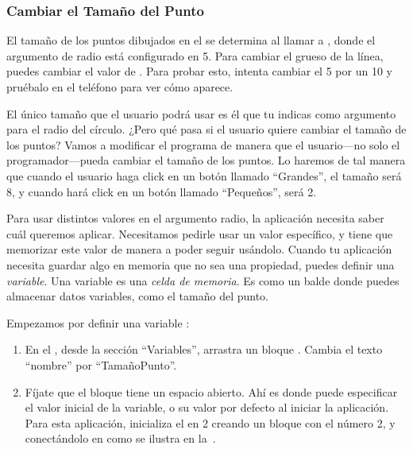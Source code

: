 \subsubsection*{Cambiar el Tamaño del Punto}

El tamaño de los puntos dibujados en el  se
determina al llamar a , donde el
argumento de radio está configurado en 5. Para cambiar el grueso de la
línea, puedes cambiar el valor de . Para probar esto,
intenta cambiar el 5 por un 10 y pruébalo en el teléfono para ver cómo
aparece.

El único tamaño que el usuario podrá usar es él que tu indicas como
argumento para el radio del círculo. ¿Pero qué pasa si el usuario
quiere cambiar el tamaño de los puntos? Vamos a modificar el programa
de manera que el usuario---no solo el programador---pueda cambiar el
tamaño de los puntos. Lo haremos de tal manera que cuando el usuario
haga click en un botón llamado ``Grandes'', el tamaño será 8, y cuando
hará click en un botón llamado ``Pequeños'', será 2.

Para usar distintos valores en el argumento radio, la aplicación
necesita saber cuál queremos aplicar. Necesitamos pedirle usar un
valor específico, y tiene que memorizar este valor de manera a poder
seguir usándolo. Cuando tu aplicación necesita guardar algo en memoria
que no sea una propiedad, puedes definir una \emph{variable}. Una
variable es una \emph{celda de memoria}. Es como un balde donde puedes
almacenar datos variables, como el tamaño del punto.

Empezamos por definir una variable :

\begin{enumerate}

\item En el \blockEditor, desde la sección ``Variables'', arrastra un
  bloque . Cambia el texto
  ``nombre'' por ``TamañoPunto''.

\item Fíjate que el bloque 
  tiene un espacio abierto. Ahí es donde puede especificar el valor
  inicial de la variable, o su valor por defecto al iniciar la
  aplicación. Para esta aplicación, inicializa el
   en 2 creando un bloque con el número 2, y
  conectándolo en  como se
  ilustra en la~.
\end{enumerate}

